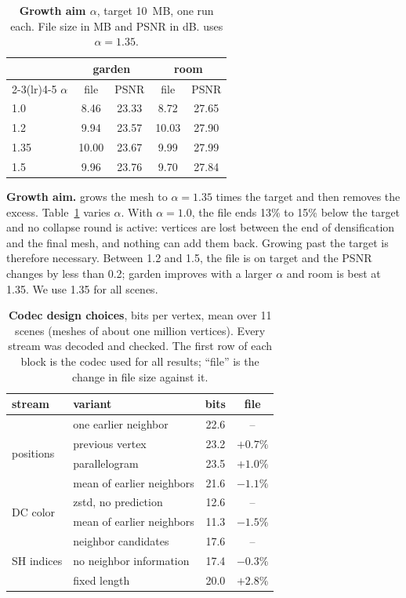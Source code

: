 \begin{table}[t]\centering\footnotesize
\caption{\textbf{Growth aim $\alpha$}, target 10~MB, one run each. File size in MB and PSNR in dB. \BM uses $\alpha = 1.35$.}
\label{tab:alpha}
\setlength{\tabcolsep}{5pt}
\begin{tabular}{@{}lcccc@{}}
\toprule
 & \multicolumn{2}{c}{garden} & \multicolumn{2}{c}{room} \\
\cmidrule(lr){2-3}\cmidrule(lr){4-5}
$\alpha$ & file & PSNR & file & PSNR \\
\midrule
1.0 & 8.46 & 23.33 & 8.72 & 27.65 \\
1.2 & 9.94 & 23.57 & 10.03 & 27.90 \\
1.35 & 10.00 & 23.67 & 9.99 & 27.99 \\
1.5 & 9.96 & 23.76 & 9.70 & 27.84 \\
\bottomrule
\end{tabular}
\end{table}

\noindent\textbf{Growth aim.} \BM grows the mesh to $\alpha = 1.35$ times the target and then removes the excess. Table~\ref{tab:alpha} varies $\alpha$. With $\alpha = 1.0$, the file ends 13\% to 15\% below the target and no collapse round is active: vertices are lost between the end of densification and the final mesh, and nothing can add them back. Growing past the target is therefore necessary. Between 1.2 and 1.5, the file is on target and the PSNR changes by less than 0.2\dB; garden improves with a larger $\alpha$ and room is best at 1.35. We use 1.35 for all scenes.

\begin{table}[t]\centering\footnotesize
\caption{\textbf{Codec design choices}, bits per vertex, mean over 11 scenes (meshes of about one million vertices). Every stream was decoded and checked. The first row of each block is the codec used for all results; ``file'' is the change in file size against it.}
\label{tab:codec-abl}
\setlength{\tabcolsep}{4pt}
\begin{tabular}{@{}llcc@{}}
\toprule
stream & variant & bits & file \\
\midrule
\multirow{4}{*}{positions} & one earlier neighbor & 22.6 & -- \\
 & previous vertex & 23.2 & $+0.7\%$ \\
 & parallelogram & 23.5 & $+1.0\%$ \\
 & mean of earlier neighbors & 21.6 & $-1.1\%$ \\
\midrule
\multirow{2}{*}{DC color} & zstd, no prediction & 12.6 & -- \\
 & mean of earlier neighbors & 11.3 & $-1.5\%$ \\
\midrule
\multirow{3}{*}{SH indices} & neighbor candidates & 17.6 & -- \\
 & no neighbor information & 17.4 & $-0.3\%$ \\
 & fixed length & 20.0 & $+2.8\%$ \\
\bottomrule
\end{tabular}
\end{table}

